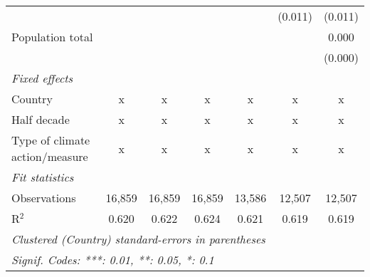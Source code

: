 \begin{tabular}{lcccccc}
                                                                                   &                &               &               &               & (0.011)       & (0.011)\\   
   Population total                                                                &                &               &               &               &               & 0.000\\   
                                                                                   &                &               &               &               &               & (0.000)\\   
   \emph{Fixed effects}\\
   Country                                                                         & x              & x             & x             & x             & x             & x\\  
   Half decade                                                                     & x              & x             & x             & x             & x             & x\\  
   Type of climate action/measure                                                  & x              & x             & x             & x             & x             & x\\  
   \midrule \emph{Fit statistics}\\
   Observations                                                                    & 16,859         & 16,859        & 16,859        & 13,586        & 12,507        & 12,507\\  
   R$^2$                                                                           & 0.620          & 0.622         & 0.624         & 0.621         & 0.619         & 0.619\\  
   \midrule
   \multicolumn{7}{l}{\emph{Clustered (Country) standard-errors in parentheses}}\\
   \multicolumn{7}{l}{\emph{Signif. Codes: ***: 0.01, **: 0.05, *: 0.1}}\\
\end{tabular}
\par\endgroup


